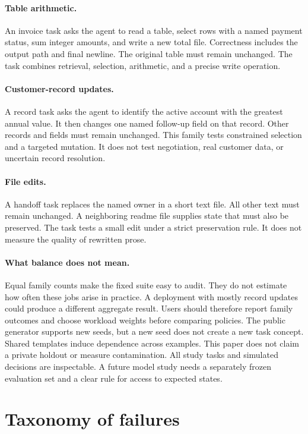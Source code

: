 \documentclass{article}
\begin{document}
\paragraph{Table arithmetic.} An invoice task asks the agent to read a table, select rows with a named payment status, sum integer amounts, and write a new total file. Correctness includes the output path and final newline. The original table must remain unchanged. The task combines retrieval, selection, arithmetic, and a precise write operation.
\paragraph{Customer-record updates.} A record task asks the agent to identify the active account with the greatest annual value. It then changes one named follow-up field on that record. Other records and fields must remain unchanged. This family tests constrained selection and a targeted mutation. It does not test negotiation, real customer data, or uncertain record resolution.
\paragraph{File edits.} A handoff task replaces the named owner in a short text file. All other text must remain unchanged. A neighboring readme file supplies state that must also be preserved. The task tests a small edit under a strict preservation rule. It does not measure the quality of rewritten prose.
\paragraph{What balance does not mean.} Equal family counts make the fixed suite easy to audit. They do not estimate how often these jobs arise in practice. A deployment with mostly record updates could produce a different aggregate result. Users should therefore report family outcomes and choose workload weights before comparing policies.
The public generator supports new seeds, but a new seed does not create a new task concept. Shared templates induce dependence across examples. This paper does not claim a private holdout or measure contamination. All study tasks and simulated decisions are inspectable. A future model study needs a separately frozen evaluation set and a clear rule for access to expected states.\par
\section{Taxonomy of failures}
\end{document}
